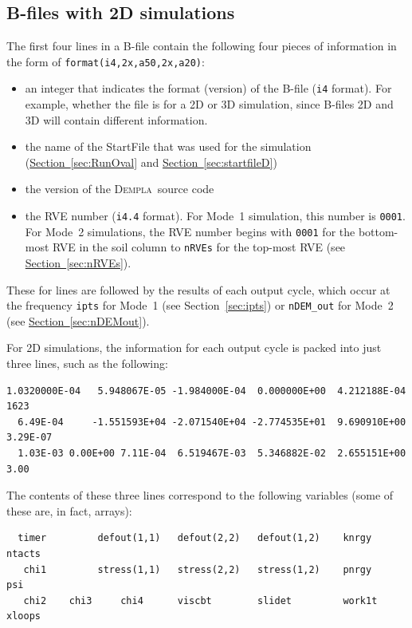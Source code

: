 \documentclass[letterpaper,11pt]{article}
\newcommand{\Dempla}{\textsc{Dempla}}
\begin{document}
\subsection{B-files with 2D simulations}\label{sec:bfile2d}
The first four lines in a B-file contain the following 
four pieces of information in the form of
\texttt{format(i4,2x,a50,2x,a20)}:
\begin{itemize}
\item
an integer that indicates the format (version) of the B-file
 (\texttt{i4} format).
For example, whether the file is for a 2D or 3D simulation,
since B-files 2D and 3D will contain different information.
\item
the name of the \textsf{StartFile} that was used for the simulation
(\hyperref[sec:RunOval]{Section~\ref*{sec:RunOval}}
and \hyperref[sec:startfileD]{Section~\ref*{sec:startfileD}})
%
\item
the version of the \Dempla\ source code
\item
the RVE number (\texttt{i4.4} format).
For Mode~1 simulation, this number is \texttt{0001}.
For Mode~2 simulations, the RVE number begins with \texttt{0001}
for the bottom-most RVE in the soil column to \texttt{nRVEs}
for the top-most RVE (see 
\hyperref[sec:nRVEs]{Section~\ref*{sec:nRVEs}}).
%
\end{itemize}
\par
These for lines are followed by the results of each output cycle,
which occur
at the frequency \texttt{ipts} for Mode~1
(see Section~\ref{sec:ipts}) or \texttt{nDEM\_out}
for Mode~2 
(see \hyperref[sec:nDEMout]{Section~\ref*{sec:nDEMout}}).
\par
For 2D simulations, the information for each output cycle is packed
into just three lines, such as the following:\\[-2ex]
\par\noindent
\footnotesize\normalfont
\begin{verbatim}
1.0320000E-04   5.948067E-05 -1.984000E-04  0.000000E+00  4.212188E-04     1623
  6.49E-04     -1.551593E+04 -2.071540E+04 -2.774535E+01  9.690910E+00 3.29E-07
  1.03E-03 0.00E+00 7.11E-04  6.519467E-03  5.346882E-02  2.655151E+00     3.00
\end{verbatim}
\normalsize\normalfont
\par\noindent
\rule{0ex}{3ex}The contents of these three lines
correspond to the following variables (some of these
are, in fact, arrays):\\[-2ex]
\footnotesize\normalfont
\begin{verbatim}
  timer         defout(1,1)   defout(2,2)   defout(1,2)    knrgy         ntacts
   chi1         stress(1,1)   stress(2,2)   stress(1,2)    pnrgy           psi 
   chi2    chi3     chi4      viscbt        slidet         work1t        xloops
\end{verbatim}
\end{document}
